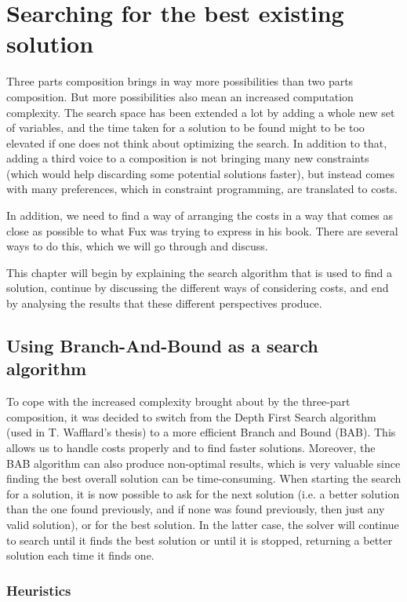 \chapter{Searching for the best existing solution}\label{chapter:search}
Three parts composition brings in way more possibilities than two parts composition. 
But more possibilities also mean an increased computation complexity. The search space has been extended a lot by adding a whole new set of variables, and the time taken for a solution to be found might to be too elevated if one does not think about optimizing the search. In addition to that, adding a third voice to a composition is not bringing many new constraints (which would help discarding some potential solutions faster), but instead comes with many preferences, which in constraint programming, are translated to costs.

In addition, we need to find a way of arranging the costs in a way that comes as close as possible to what Fux was trying to express in his book. There are several ways to do this, which we will go through and discuss.  

This chapter will begin by explaining the search algorithm that is used to find a solution, continue by discussing the different ways of considering costs, and end by analysing the results that these different perspectives produce.

\section{Using Branch-And-Bound as a search algorithm}

To cope with the increased complexity brought about by the three-part composition, it was decided to switch from the Depth First Search algorithm (used in T. Wafflard's thesis) to a more efficient Branch and Bound (BAB). This allows us to handle costs properly and to find faster solutions. Moreover, the BAB algorithm can also produce non-optimal results, which is very valuable since finding the best overall solution can be time-consuming. When starting the search for a solution, it is now possible to ask for the next solution (i.e. a better solution than the one found previously, and if none was found previously, then just any valid solution), or for the best solution. In the latter case, the solver will continue to search until it finds the best solution or until it is stopped, returning a better solution each time it finds one.


\subsection{Heuristics} \label{heuristics}
